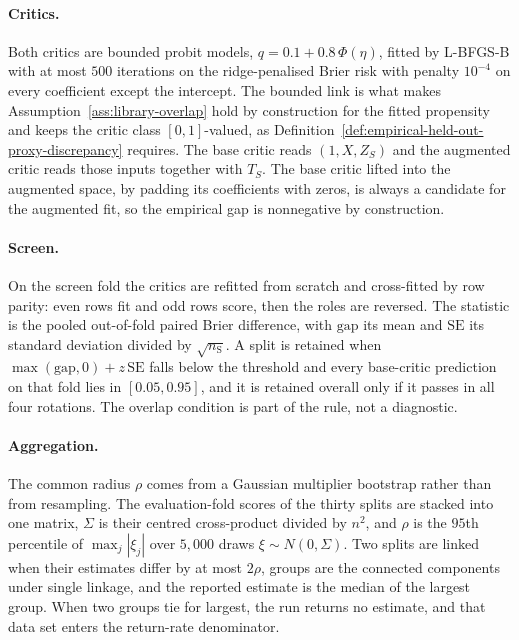 {\paragraph{Critics.} Both critics are bounded probit models, $q=0.1+0.8\,\Phi(\eta)$, fitted by L-BFGS-B with at most $500$ iterations on the ridge-penalised Brier risk with penalty $10^{-4}$ on every coefficient except the intercept. The bounded link is what makes Assumption~\ref{ass:library-overlap} hold by construction for the fitted propensity and keeps the critic class $[0,1]$-valued, as Definition~\ref{def:empirical-held-out-proxy-discrepancy} requires. The base critic reads $(1,X,Z_S)$ and the augmented critic reads those inputs together with $T_S$. The base critic lifted into the augmented space, by padding its coefficients with zeros, is always a candidate for the augmented fit, so the empirical gap is nonnegative by construction.

\paragraph{Screen.} On the screen fold the critics are refitted from scratch and cross-fitted by row parity: even rows fit and odd rows score, then the roles are reversed. The statistic is the pooled out-of-fold paired Brier difference, with $\mathrm{gap}$ its mean and $\mathrm{SE}$ its standard deviation divided by $\sqrt{n_{\mathrm S}}$. A split is retained when $\max(\mathrm{gap},0)+z\,\mathrm{SE}$ falls below the threshold and every base-critic prediction on that fold lies in $[0.05,0.95]$, and it is retained overall only if it passes in all four rotations. The overlap condition is part of the rule, not a diagnostic.

\paragraph{Aggregation.} The common radius $\rho$ comes from a Gaussian multiplier bootstrap rather than from resampling. The evaluation-fold scores of the thirty splits are stacked into one matrix, $\Sigma$ is their centred cross-product divided by $n^2$, and $\rho$ is the $95$th percentile of $\max_j|\xi_j|$ over $5{,}000$ draws $\xi\sim N(0,\Sigma)$. Two splits are linked when their estimates differ by at most $2\rho$, groups are the connected components under single linkage, and the reported estimate is the median of the largest group. When two groups tie for largest, the run returns no estimate, and that data set enters the return-rate denominator.

}
